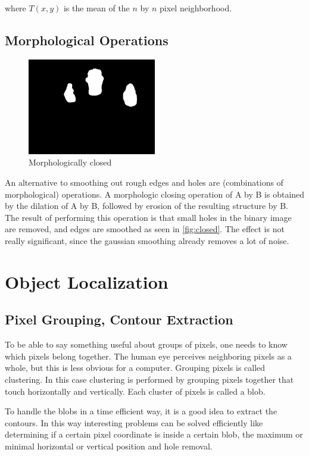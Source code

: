 where $T(x,y)$ is the mean of the $n$ by $n$ pixel neighborhood.

\subsection*{Morphological Operations}

\begin{figure}[tb]
    \center{}
    \includegraphics[width=0.5\textwidth]{figures/pipeline/closed.jpg}
	\caption{Morphologically closed}
	\label{fig:closed}
\end{figure}

An alternative to smoothing out rough edges and holes are (combinations of morphological) operations.  A morphologic closing operation of A by B is obtained by the dilation of A by B, followed by erosion of the resulting structure by B. The result of performing this operation is that small holes in the binary image are removed, and edges are smoothed as seen in \autoref{fig:closed}. The effect is not really significant, since the gaussian smoothing already removes a lot of noise. 


\section{Object Localization}

\subsection*{Pixel Grouping, Contour Extraction}
To be able to say something useful about groups of pixels, one needs to know which pixels belong together. The human eye perceives neighboring pixels as a whole, but this is less obvious for a computer. Grouping pixels is called clustering. In this case clustering is performed by grouping pixels together that touch horizontally and vertically. Each cluster of pixels is called a blob.

To handle the blobs in a time efficient way, it is a good idea to extract the contours. In this way interesting problems can be solved efficiently like determining if a certain pixel coordinate is inside a certain blob, the maximum or minimal horizontal or vertical position and hole removal.

